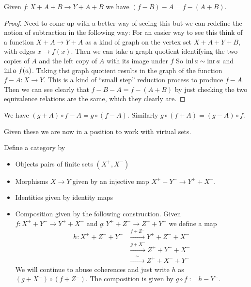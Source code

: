 \documentclass{article}
\begin{document}
\begin{lemma}
    Given $f : X + A + B \to Y + A + B$ we have $(f - B) - A = f - (A + B)$.
\end{lemma}
\begin{proof}
    Need to come up with a better way of seeing this but we can redefine the notion of subtraction in the following way:
    For an easier way to see this think of a function $X + A \to Y + A$ as a kind of graph on the vertex set $X + A + Y + B$, with edges $x \to f(x)$.
    Then we can take a graph quotient identifying the two copies of $A$ and the left copy of $A$ with its image under $f$
    So $\operatorname{inl} a \sim \operatorname{inr} a$ and $\operatorname{inl} a ~ f(a)$.
    Taking thsi graph quotient results in the graph of the function $f - A : X \to Y$. 
    This is a kind of ``small step'' reduction process to produce $f - A$.
    Then we can see clearly that $f - B - A = f - (A + B)$ by just checking the two equivalence relations are the same, which they clearly are.
\end{proof}

\begin{lemma}
    We have $(g + A) \circ f - A = g \circ (f - A)$.
    Similarly $g \circ (f + A) = (g - A) \circ f$.
\end{lemma}


Given these we are now in a position to work with virtual sets.

\begin{definition}
    Define a category by 
    \begin{itemize}
        \item Objects pairs of finite sets $(X^+, X^-)$
        \item Morphisms $X \to Y$ given by an injective map $X^+ + Y^- \to Y^+ + X^-$.
        \item Identities given by identity maps
        \item Composition given by the following construction. Given $f : X^+ + Y^- \to Y^+ + X^-$ and $g : Y^+ + Z^- \to Z^+ + Y^-$ we define a map
        \begin{align*}
            h : X^+ + Z^- + Y^- &\xrightarrow{f + Z^-} Y^+ + Z^- + X^- \\ 
                            &\xrightarrow{g + X^-} Z^+ + Y^- + X^- \\
                            &\xrightarrow{\; \; \; \; \sim \; \; \; \;  }  Z^+ + X^- + Y^- 
        \end{align*}
        We will continue to abuse coherences and just write $h$ as $(g + X^-) \circ (f + Z^-)$.       
        The composition is given by $g \circ f := h - Y^-$. 
    \end{itemize}
\end{definition}
\end{document}
